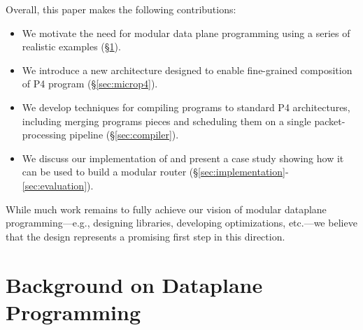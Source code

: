 \documentclass[letterpaper,twocolumn,10pt]{article}
\begin{document}
Overall, this paper makes the following contributions:
\begin{itemize}
\item We motivate the need for modular data plane programming using a
  series of realistic examples (\S\ref{sec:background}).
\item We introduce a new architecture designed to enable fine-grained
  composition of P4 program (\S\ref{sec:microp4}).
\item We develop techniques for compiling programs to standard P4
  architectures, including merging programs pieces and scheduling them
  on a single packet-processing pipeline (\S\ref{sec:compiler}).
\item We discuss our implementation of \ulang and present a case study
  showing how it can be used to build a modular router
  (\S\ref{sec:implementation}-\ref{sec:evaluation}).
\end{itemize}
%
While much work remains to fully achieve our vision of modular
dataplane programming---e.g., designing libraries, developing
optimizations, etc.---we believe that the \ulang design represents a
promising first step in this direction.

\section{Background on Dataplane Programming}
\label{sec:background}




\end{document}
